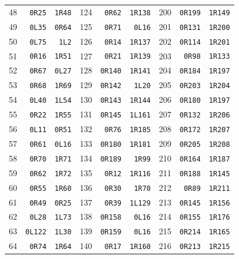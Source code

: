{\begin{longtable}{rrr@{\hspace{8mm}}rrr@{\hspace{8mm}}rrr}
48 & \texttt{0R25} & \texttt{1R48} & 124 & \texttt{0R62} & \texttt{1R138} & 200 & \texttt{0R199} & \texttt{1R149}\\
49 & \texttt{0L35} & \texttt{0R64} & 125 & \texttt{0R71} & \texttt{0L16} & 201 & \texttt{0R131} & \texttt{1R200}\\
50 & \texttt{0L75} & \texttt{1L2} & 126 & \texttt{0R14} & \texttt{1R137} & 202 & \texttt{0R114} & \texttt{1R201}\\
51 & \texttt{0R16} & \texttt{1R51} & 127 & \texttt{0R21} & \texttt{1R139} & 203 & \texttt{0R98} & \texttt{1R133}\\
52 & \texttt{0R67} & \texttt{0L27} & 128 & \texttt{0R140} & \texttt{1R141} & 204 & \texttt{0R184} & \texttt{1R197}\\
53 & \texttt{0R68} & \texttt{1R69} & 129 & \texttt{0R142} & \texttt{1L20} & 205 & \texttt{0R203} & \texttt{1R204}\\
54 & \texttt{0L40} & \texttt{1L54} & 130 & \texttt{0R143} & \texttt{1R144} & 206 & \texttt{0R180} & \texttt{1R197}\\
55 & \texttt{0R22} & \texttt{1R55} & 131 & \texttt{0R145} & \texttt{1L161} & 207 & \texttt{0R132} & \texttt{1R206}\\
56 & \texttt{0L11} & \texttt{0R51} & 132 & \texttt{0R76} & \texttt{1R185} & 208 & \texttt{0R172} & \texttt{1R207}\\
57 & \texttt{0R61} & \texttt{0L16} & 133 & \texttt{0R180} & \texttt{1R181} & 209 & \texttt{0R205} & \texttt{1R208}\\
58 & \texttt{0R70} & \texttt{1R71} & 134 & \texttt{0R189} & \texttt{1R99} & 210 & \texttt{0R164} & \texttt{1R187}\\
59 & \texttt{0R62} & \texttt{1R72} & 135 & \texttt{0R12} & \texttt{1R116} & 211 & \texttt{0R188} & \texttt{1R145}\\
60 & \texttt{0R55} & \texttt{1R60} & 136 & \texttt{0R30} & \texttt{1R70} & 212 & \texttt{0R89} & \texttt{1R211}\\
61 & \texttt{0R49} & \texttt{0R25} & 137 & \texttt{0R39} & \texttt{1L129} & 213 & \texttt{0R145} & \texttt{1R156}\\
62 & \texttt{0L28} & \texttt{1L73} & 138 & \texttt{0R158} & \texttt{0L16} & 214 & \texttt{0R155} & \texttt{1R176}\\
63 & \texttt{0L122} & \texttt{1L30} & 139 & \texttt{0R159} & \texttt{0L16} & 215 & \texttt{0R214} & \texttt{1R165}\\
64 & \texttt{0R74} & \texttt{1R64} & 140 & \texttt{0R17} & \texttt{1R160} & 216 & \texttt{0R213} & \texttt{1R215}\\

\end{longtable}}
